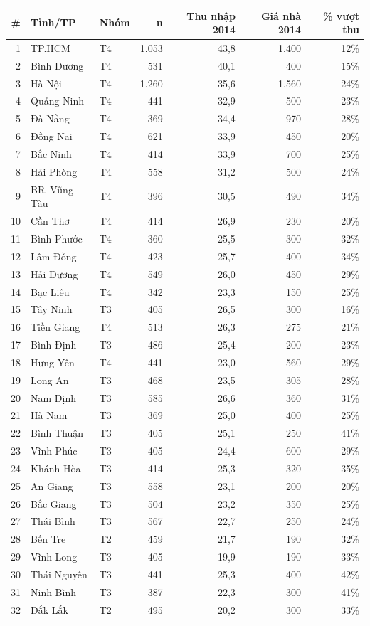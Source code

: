 \begin{tabular}{rllrrrr}
\toprule
\# & Tỉnh/TP & Nhóm & n & Thu nhập 2014 & Giá nhà 2014 & \% vượt thu \\
\midrule
1 & TP.HCM & T4 & 1.053 & 43,8 & 1.400 & 12\% \\
2 & Bình Dương & T4 & 531 & 40,1 & 400 & 15\% \\
3 & Hà Nội & T4 & 1.260 & 35,6 & 1.560 & 24\% \\
4 & Quảng Ninh & T4 & 441 & 32,9 & 500 & 23\% \\
5 & Đà Nẵng & T4 & 369 & 34,4 & 970 & 28\% \\
6 & Đồng Nai & T4 & 621 & 33,9 & 450 & 20\% \\
7 & Bắc Ninh & T4 & 414 & 33,9 & 700 & 25\% \\
8 & Hải Phòng & T4 & 558 & 31,2 & 500 & 24\% \\
9 & BR–Vũng Tàu & T4 & 396 & 30,5 & 490 & 34\% \\
10 & Cần Thơ & T4 & 414 & 26,9 & 230 & 20\% \\
11 & Bình Phước & T4 & 360 & 25,5 & 300 & 32\% \\
12 & Lâm Đồng & T4 & 423 & 25,7 & 400 & 34\% \\
13 & Hải Dương & T4 & 549 & 26,0 & 450 & 29\% \\
14 & Bạc Liêu & T4 & 342 & 23,3 & 150 & 25\% \\
15 & Tây Ninh & T3 & 405 & 26,5 & 300 & 16\% \\
16 & Tiền Giang & T4 & 513 & 26,3 & 275 & 21\% \\
17 & Bình Định & T3 & 486 & 25,4 & 200 & 23\% \\
18 & Hưng Yên & T4 & 441 & 23,0 & 560 & 29\% \\
19 & Long An & T3 & 468 & 23,5 & 305 & 28\% \\
20 & Nam Định & T3 & 585 & 26,6 & 360 & 31\% \\
21 & Hà Nam & T3 & 369 & 25,0 & 400 & 25\% \\
22 & Bình Thuận & T3 & 405 & 25,1 & 250 & 41\% \\
23 & Vĩnh Phúc & T3 & 405 & 24,4 & 600 & 29\% \\
24 & Khánh Hòa & T3 & 414 & 25,3 & 320 & 35\% \\
25 & An Giang & T3 & 558 & 23,1 & 200 & 20\% \\
26 & Bắc Giang & T3 & 504 & 23,2 & 350 & 25\% \\
27 & Thái Bình & T3 & 567 & 22,7 & 250 & 24\% \\
28 & Bến Tre & T2 & 459 & 21,7 & 190 & 32\% \\
29 & Vĩnh Long & T3 & 405 & 19,9 & 190 & 33\% \\
30 & Thái Nguyên & T3 & 441 & 25,3 & 400 & 42\% \\
31 & Ninh Bình & T3 & 387 & 22,3 & 300 & 41\% \\
32 & Đắk Lắk & T2 & 495 & 20,2 & 300 & 33\% \\
\bottomrule
\end{tabular}
